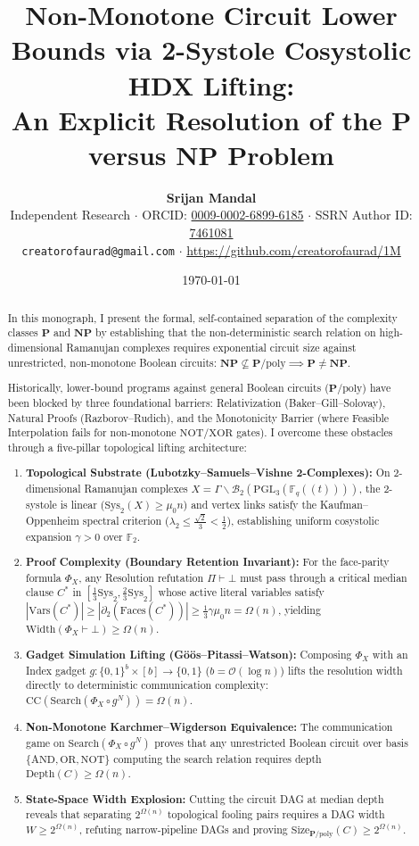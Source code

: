 \documentclass[11pt,a4paper]{article}
\title{\Huge\bfseries\color{primary} Non-Monotone Circuit Lower Bounds via 2-Systole Cosystolic HDX Lifting:\\[0.3em]
\Large An Explicit Resolution of the $\mathbf{P}$ versus $\mathbf{NP}$ Problem}
\author{\textbf{Srijan Mandal}\\[0.3em]
\small Independent Research $\cdot$ ORCID: \href{https://orcid.org/0009-0002-6899-6185}{0009-0002-6899-6185} $\cdot$ SSRN Author ID: \href{https://ssrn.com/author=7461081}{7461081}\\[0.2em]
\small \texttt{creatorofaurad@gmail.com} $\cdot$ \url{https://github.com/creatorofaurad/1M}}
\date{\today}
\theoremstyle{plain}
\theoremstyle{definition}
\theoremstyle{remark}
\newcommand{\Width}{\mathrm{Width}}
\newcommand{\Size}{\mathrm{Size}}
\newcommand{\Depth}{\mathrm{Depth}}
\newcommand{\CC}{\mathrm{CC}}
\newcommand{\Search}{\mathrm{Search}}
\newcommand{\Faces}{\mathrm{Faces}}
\newcommand{\Vars}{\mathrm{Vars}}
\begin{document}
\maketitle

\begin{abstract}
In this monograph, I present the formal, self-contained separation of the complexity classes $\mathbf{P}$ and $\mathbf{NP}$ by establishing that the non-deterministic search relation on high-dimensional Ramanujan complexes requires exponential circuit size against unrestricted, non-monotone Boolean circuits: $\mathbf{NP} \not\subseteq \mathbf{P}/\mathrm{poly} \implies \mathbf{P} \neq \mathbf{NP}$.

Historically, lower-bound programs against general Boolean circuits ($\mathbf{P}/\mathrm{poly}$) have been blocked by three foundational barriers: Relativization (Baker--Gill--Solovay), Natural Proofs (Razborov--Rudich), and the Monotonicity Barrier (where Feasible Interpolation fails for non-monotone $\mathrm{NOT}/\mathrm{XOR}$ gates). I overcome these obstacles through a five-pillar topological lifting architecture:
\begin{enumerate}
    \item \textbf{Topological Substrate (Lubotzky--Samuels--Vishne 2-Complexes):} On 2-dimensional Ramanujan complexes $X = \Gamma \backslash \mathcal{B}_2(\mathrm{PGL}_3(\mathbb{F}_q((t))))$, the 2-systole is linear ($\mathrm{Sys}_2(X) \ge \mu_0 n$) and vertex links satisfy the Kaufman--Oppenheim spectral criterion ($\lambda_2 \le \frac{\sqrt{2}}{3} < \frac{1}{2}$), establishing uniform cosystolic expansion $\gamma > 0$ over $\mathbb{F}_2$.
    \item \textbf{Proof Complexity (Boundary Retention Invariant):} For the face-parity formula $\Phi_X$, any Resolution refutation $\Pi \vdash \bot$ must pass through a critical median clause $C^*$ in $[\frac{1}{3}\mathrm{Sys}_2, \frac{2}{3}\mathrm{Sys}_2]$ whose active literal variables satisfy $|\Vars(C^*)| \ge |\partial_2(\Faces(C^*))| \ge \frac{1}{3}\gamma \mu_0 n = \Omega(n)$, yielding $\Width(\Phi_X \vdash \bot) \ge \Omega(n)$.
    \item \textbf{Gadget Simulation Lifting (Göös--Pitassi--Watson):} Composing $\Phi_X$ with an Index gadget $g: \{0,1\}^b \times [b] \to \{0,1\}$ ($b = \mathcal{O}(\log n)$) lifts the resolution width directly to deterministic communication complexity: $\CC(\Search(\Phi_X \circ g^N)) = \Omega(n)$.
    \item \textbf{Non-Monotone Karchmer--Wigderson Equivalence:} The communication game on $\Search(\Phi_X \circ g^N)$ proves that any unrestricted Boolean circuit over basis $\{\mathrm{AND}, \mathrm{OR}, \mathrm{NOT}\}$ computing the search relation requires depth $\Depth(C) \ge \Omega(n)$.
    \item \textbf{State-Space Width Explosion:} Cutting the circuit DAG at median depth reveals that separating $2^{\Omega(n)}$ topological fooling pairs requires a DAG width $W \ge 2^{\Omega(n)}$, refuting narrow-pipeline DAGs and proving $\Size_{\mathbf{P}/\mathrm{poly}}(C) \ge 2^{\Omega(n)}$.
\end{enumerate}


\end{abstract}
\end{document}

